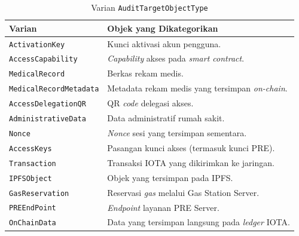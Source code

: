 \begin{table}[htbp]
\centering
\caption{Varian \texttt{AuditTargetObjectType}}
\label{tab:enum-target-object-type}
\renewcommand{\arraystretch}{1.3}
\begin{tabular}{|p{4.5cm}|p{7.5cm}|}
\hline
\textbf{Varian} & \textbf{Objek yang Dikategorikan} \\
\hline
\texttt{ActivationKey} & Kunci aktivasi akun pengguna. \\
\hline
\texttt{AccessCapability} & \textit{Capability} akses pada \textit{smart contract}. \\
\hline
\texttt{MedicalRecord} & Berkas rekam medis. \\
\hline
\texttt{MedicalRecordMetadata} & Metadata rekam medis yang tersimpan \textit{on-chain}. \\
\hline
\texttt{AccessDelegationQR} & QR \textit{code} delegasi akses. \\
\hline
\texttt{AdministrativeData} & Data administratif rumah sakit. \\
\hline
\texttt{Nonce} & \textit{Nonce} sesi yang tersimpan sementara. \\
\hline
\texttt{AccessKeys} & Pasangan kunci akses (termasuk kunci PRE). \\
\hline
\texttt{Transaction} & Transaksi IOTA yang dikirimkan ke jaringan. \\
\hline
\texttt{IPFSObject} & Objek yang tersimpan pada IPFS. \\
\hline
\texttt{GasReservation} & Reservasi \textit{gas} melalui Gas Station Server. \\
\hline
\texttt{PREEndPoint} & \textit{Endpoint} layanan PRE Server. \\
\hline
\texttt{OnChainData} & Data yang tersimpan langsung pada \textit{ledger} IOTA. \\
\hline
\end{tabular}
\end{table}